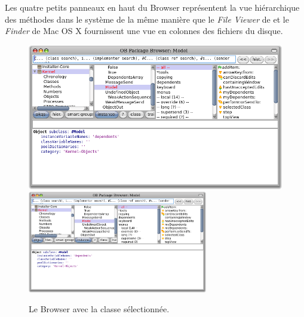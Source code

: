 \documentclass[a4paper,10pt,twoside]{book}
\begin{document}
Les quatre petits panneaux en haut du Browser repr\'esentent la vue
hi\'erarchique des m\'ethodes dans le syst\`eme de la m\^eme
mani\`ere que le \textit{File Viewer} de  et le
\textit{Finder} de Mac OS X fournissent une vue en colonnes 
des fichiers du disque.


\begin{figure}[htbp]
   \centering
   \ifluluelse
	   {\includegraphics[width=\textwidth]{SystemBrowser1} }
	   {\includegraphics[width=0.7\textwidth]{SystemBrowser1} }
   \caption{Le Browser avec la classe  s\'electionn\'ee.}
\end{figure}
\end{document}
